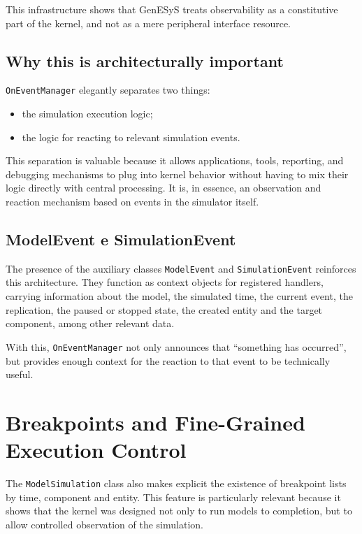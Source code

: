 This infrastructure shows that GenESyS treats observability as a constitutive part of the kernel, and not as a mere peripheral interface resource.

\subsection{Why this is architecturally important}
\label{subsec:cap7_por_que_oneventmanager_importante}

\texttt{OnEventManager} elegantly separates two things:
\begin{itemize}
 \item the simulation execution logic;
 \item the logic for reacting to relevant simulation events.
\end{itemize}

This separation is valuable because it allows applications, tools, reporting, and debugging mechanisms to plug into kernel behavior without having to mix their logic directly with central processing. It is, in essence, an observation and reaction mechanism based on events in the simulator itself.

\subsection{ModelEvent e SimulationEvent}
\label{subsec:cap7_modelevent_simulationevent}

The presence of the auxiliary classes \texttt{ModelEvent} and \texttt{SimulationEvent} reinforces this architecture. They function as context objects for registered handlers, carrying information about the model, the simulated time, the current event, the replication, the paused or stopped state, the created entity and the target component, among other relevant data.

With this, \texttt{OnEventManager} not only announces that ``something has occurred'', but provides enough context for the reaction to that event to be technically useful.

\section{Breakpoints and Fine-Grained Execution Control}
\label{sec:cap7_breakpoints_controle_fino_execucao}

The \texttt{ModelSimulation} class also makes explicit the existence of breakpoint lists by time, component and entity. This feature is particularly relevant because it shows that the kernel was designed not only to run models to completion, but to allow controlled observation of the simulation.

